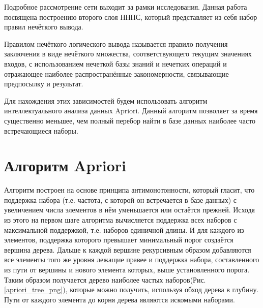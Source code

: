 \documentclass[a4paper,12pt]{article}
\begin{document}
Подробное рассмотрение сети выходит за рамки исследования. Данная работа посвящена построению второго слоя ННПС, который представляет из себя набор правил нечёткого вывода. 

Правилом нечёткого логического вывода называется правило получения заключения в виде нечёткого множества, соответствующего текущим значениях входов, с использованием нечеткой базы знаний и нечетких операций и отражающее наиболее распространённые закономерности, связывающие предпосылку и результат.

Для нахождения этих зависимостей будем использовать алгоритм интеллектуального анализа данных Apriori. Данный алгоритм позволяет за время существенно меньшее, чем полный перебор найти в базе данных наиболее часто встречающиеся наборы.

\section{Алгоритм Apriori}

Алгоритм построен на основе принципа антимонотонности, который гласит, что поддержка набора (т.е. частота, с которой он встречается в базе данных) с увеличением числа элементов в нём уменьшается или остаётся прежней. Исходя из этого на первом шаге алгоритма вычисляется поддержка всех наборов с максимальной поддержкой, т.е. наборов единичной длины. И для каждого из элементов, поддержка которого превышает минимальный порог создаётся вершина дерева. Дальше к каждой вершине рекурсивным образом добавляются все элементы того же уровня лежащие правее и поддержка набора, составленного из пути от вершины и нового элемента которых, выше установленного порога. Таким образом получается дерево наиболее частых наборов(Рис. \ref{apriori_tree_png}), которые можно получить, используя обход дерева в глубину. Пути от каждого элемента до корня дерева являются искомыми наборами.

\begin{center}
\end{center}
\end{document}
